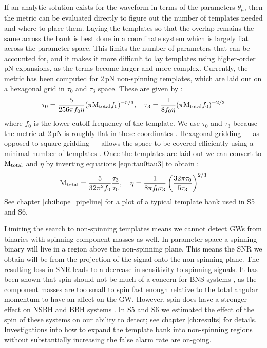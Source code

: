 If an analytic solution exists for the waveform in terms of the parameters $\theta_\mu$, then the metric can be evaluated directly to figure out the number of templates needed and where to place them. Laying the templates so that the overlap remains the same across the bank is best done in a coordinate system which is largely flat across the parameter space. This limits the number of parameters that can be accounted for, and it makes it more difficult to lay templates using higher-order \ac{pN} expansions, as the terms become larger and more complex. Currently, the metric has been computed for $2\,$\ac{pN} non-spinning templates, which are laid out on a hexagonal grid in $\tau_0$ and $\tau_3$ space. These are given by \cite{ref:Babak.et.al:2006}:
\begin{equation}
\label{eqn:tau0tau3}
\tau_0 = \frac{5}{256\pi f_0 \eta}(\pi \mtotal f_0)^{-5/3}, \quad \tau_3 = \frac{1}{8 f_0 \eta}(\pi \mtotal f_0)^{-2/3}
\end{equation}
where $f_0$ is the lower cutoff frequency of the template. We use $\tau_0$ and $\tau_3$ because the metric at $2\,$\ac{pN} is roughly flat in these coordinates \cite{ref:Babak.et.al:2006}. Hexagonal gridding --- as opposed to square gridding --- allows the space to be covered efficiently using a minimal number of templates \cite{ref:Cokelaer:2007}. Once the templates are laid out we can convert to $\mathrm{M_{total}}$ and $\eta$ by inverting equations \ref{eqn:tau0tau3} to obtain \cite{ref:Babak.et.al:2006}:
\begin{equation}
\mathrm{M_{total}} = \frac{5}{32\pi^2 f_0}\frac{\tau_3}{\tau_0}, \quad \eta = \frac{1}{8\pi f_0 \tau_3}\left(\frac{32\pi \tau_0}{5\tau_3}\right)^{2/3}
\end{equation}
See chapter \ref{ch:ihope_pipeline} for a plot of a typical template bank used in \ac{S5} and \ac{S6}.

Limiting the search to non-spinning templates means we cannot detect \acp{GW} from binaries with spinning component masses as well. In parameter space a spinning binary will live in a region above the non-spinning plane. This means the \ac{SNR} we obtain will be from the projection of the signal onto the non-spinning plane. The resulting loss in \ac{SNR} leads to a decrease in sensitivity to spinning signals. It has been shown that spin should not be much of a concern for \ac{BNS} systems \cite{ref:?}, as the component masses are too small to spin fast enough relative to the total angular momentum to have an affect on the \ac{GW}. However, spin does have a stronger effect on \ac{NSBH} and \ac{BBH} systems \cite{ref:?}. In \ac{S5} and \ac{S6} we estimated the effect of the spin of these systems on our ability to detect; see chapter \ref{ch:results} for details. Investigations into how to expand the template bank into non-spinning regions without substantially increasing the false alarm rate are on-going.

